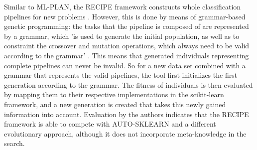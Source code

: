 Similar to ML-PLAN, the RECIPE framework constructs whole classification pipelines for new problems \cite{DBLP:conf/eurogp/SaPOP17}. However, this is done by means of grammar-based genetic programming: the tasks that the pipeline is composed of are represented by a grammar, which 'is used to generate the initial population, as well as to constraint the crossover and mutation operations, which always need to be valid according to the grammar' \cite{DBLP:conf/eurogp/SaPOP17}. This means that generated individuals representing complete pipelines can never be invalid. So for a new data set combined with a grammar that represents the valid pipelines, the tool first initializes the first generation according to the grammar. The fitness of individuals is then evaluated by mapping them to their respective implementations in the scikit-learn framework, and a new generation is created that takes this newly gained information into account. Evaluation by the authors indicates that the RECIPE framework is able to compete with AUTO-SKLEARN and a different evolutionary approach, although it does not incorporate meta-knowledge in the search.